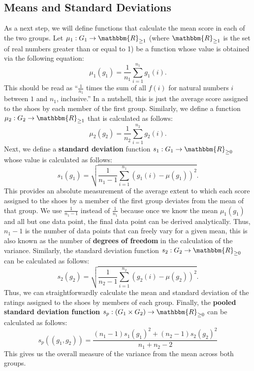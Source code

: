 \documentclass[11pt]{article}
\theoremstyle{definition}
\theoremstyle{remark}
\begin{document}
\subsection{Means and Standard Deviations}
As a next step, we will define functions that calculate the mean score in each of the two groups. Let $\mu_{1}:G_{1}\rightarrow\mathbbm{R}_{\geq1}$ (where $\mathbbm{R}_{\geq1}$ is the set of real numbers greater than or equal to 1) be a function whose value is obtained via the following equation:
$$\mu_{1}(g_{1})=\frac{1}{n_{1}}\sum_{i=1}^{n_{1}}g_{1}(i).$$
This should be read as ``$\frac{1}{n_{1}}$ times the sum of all $f(i)$ for natural numbers $i$ between $1$ and $n_{1}$, inclusive.'' In a nutshell, this is just the average score assigned to the shoes by each member of the first group. Similarly, we define a function $\mu_{2}:G_{2}\rightarrow\mathbbm{R}_{\geq1}$ that is calculated as follows:
$$\mu_{2}(g_{2})=\frac{1}{n_{2}}\sum_{i=1}^{n_{2}}g_{2}(i).$$
Next, we define a \textbf{standard deviation} function $s_{1}:G_{1}\rightarrow\mathbbm{R}_{\geq 0}$ whose value is calculated as follows:
$$s_{1}(g_{1})=\sqrt{\frac{1}{n_{1}-1}\sum_{i=1}^{n_{1}}\left(g_{1}(i)-\mu(g_{1})\right)^{2}}.$$
This provides an absolute measurement of the average extent to which each score assigned to the shoes by a member of the first group deviates from the mean of that group. We use $\frac{1}{n_{1}-1}$ instead of $\frac{1}{n_{1}}$ because once we know the mean $\mu_{1}(g_{1})$ and all but one data point, the final data point can be derived analytically. Thus, $n_{1}-1$ is the number of data points that can freely vary for a given mean, this is also known as the number of \textbf{degrees of freedom} in the calculation of the variance. Similarly, the standard deviation function $s_{2}:G_{2}\rightarrow\mathbbm{R}_{\geq 0}$ can be calculated as follows:
$$s_{2}(g_{2})=\sqrt{\frac{1}{n_{2}-1}\sum_{i=1}^{n_{2}}\left(g_{2}(i)-\mu(g_{2})\right)^{2}}.$$
Thus, we can straightforwardly calculate the mean and standard deviation of the ratings assigned to the shoes by members of each group. Finally, the \textbf{pooled standard deviation function} $s_{p}:(G_{1}\times G_{2})\rightarrow\mathbbm{R}_{\geq0}$ can be calculated as follows:
$$s_{p}((g_{1},g_{2}))=\frac{(n_{1}-1)s_{1}(g_{1})^{2} + (n_{2}-1)s_{2}(g_{2})^{2}}{n_{1}+n_{2} -2}$$
This gives us the overall measure of the variance from the mean across both groups. 
\end{document}
